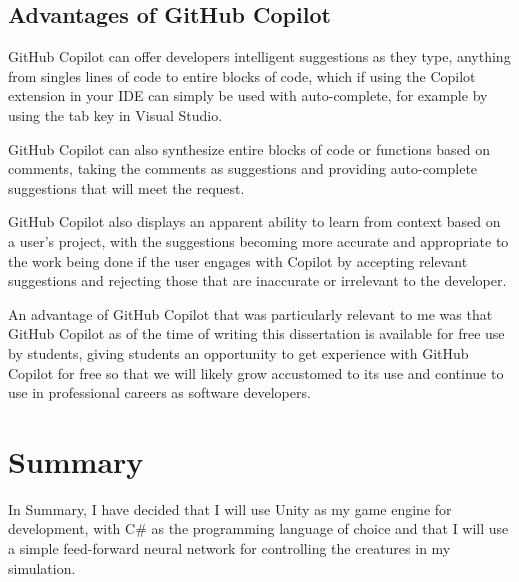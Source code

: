 \subsection{Advantages of GitHub Copilot}
GitHub Copilot can offer developers intelligent suggestions as they type, anything from singles lines of code to entire blocks of code, which if using the Copilot extension in your IDE can simply be used with auto-complete, for example by using the tab key in Visual Studio.
\par
GitHub Copilot can also synthesize entire blocks of code or functions based on comments, taking the comments as suggestions and providing auto-complete suggestions that will meet the request.
\par
GitHub Copilot also displays an apparent ability to learn from context based on a user's project, with the suggestions becoming more accurate and appropriate to the work being done if the user engages with Copilot by accepting relevant suggestions and rejecting those that are inaccurate or irrelevant to the developer.
\par
An advantage of GitHub Copilot that was particularly relevant to me was that GitHub Copilot as of the time of writing this dissertation is available for free use by students, giving students an opportunity to get experience with GitHub Copilot for free so that we will likely grow accustomed to its use and continue to use in professional careers as software developers.
\section{Summary}
In Summary, I have decided that I will use Unity as my game engine for development, with C\# as the programming language of choice and that I will use a simple feed-forward neural network for controlling the creatures in my simulation.